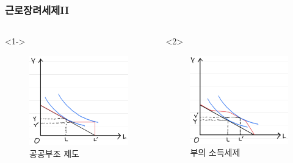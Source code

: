 \documentclass[aspectratio=169,xcolor=dvipsnames,handout]{beamer}
\begin{document}
\begin{frame}
\frametitle{근로장려세제II}
    \begin{columns}
        \begin{column}{.5\textwidth}<1->
            \begin{figure}
                \centering
                \includegraphics[width=.8\textwidth]{pic/pubsub.png}
                \caption{공공부조 제도}
            \end{figure}
        \end{column}
        \begin{column}{.5\textwidth}<2>
            \begin{figure}
                \centering
                \includegraphics[width=.8\textwidth]{pic/eitc.png}
                \caption{부의 소득세제}
            \end{figure}
        \end{column}
    \end{columns}
\end{frame}
\end{document}
